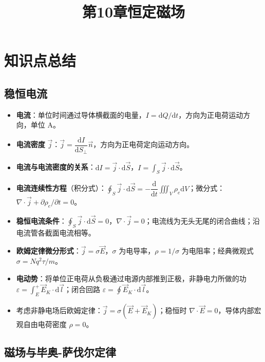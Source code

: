 \documentclass[12pt,a4paper]{ctexart}
\title{第10章\quad 恒定磁场}
\author{}
\date{}
\begin{document}
\maketitle

\section{知识点总结}

\subsection{稳恒电流}

\begin{itemize}
    \item \textbf{电流}：单位时间通过导体横截面的电量，$I=\mathrm dQ/\mathrm dt$，方向为正电荷运动方向，单位 A。
    \item \textbf{电流密度} $\vec j$：$\vec j=\dfrac{\mathrm dI}{\mathrm dS_\perp}\vec n$，方向为正电荷定向运动方向。
    \item \textbf{电流与电流密度的关系}：$\mathrm dI=\vec j\cdot\mathrm d\vec S$，$I=\displaystyle\int_S\vec j\cdot\mathrm d\vec S$。
    \item \textbf{电流连续性方程}（积分式）：$\displaystyle\oint_S\vec j\cdot\mathrm d\vec S=-\dfrac{\mathrm d}{\mathrm dt}\iiint_V\rho_e\mathrm dV$；微分式：$\nabla\cdot\vec j+\partial\rho_e/\partial t=0$。
    \item \textbf{稳恒电流条件}：$\displaystyle\oint_S\vec j\cdot\mathrm d\vec S=0$，$\nabla\cdot\vec j=0$；电流线为无头无尾的闭合曲线；沿电流管各截面电流相等。
    \item \textbf{欧姆定律微分形式}：$\vec j=\sigma\vec E$，$\sigma$ 为电导率，$\rho=1/\sigma$ 为电阻率；经典微观式 $\sigma=Nq^2\tau/m$。
    \item \textbf{电动势}：将单位正电荷从负极通过电源内部推到正极，非静电力所做的功 $\varepsilon=\displaystyle\int_E^+\vec E_K\cdot\mathrm d\vec l$；闭合回路 $\varepsilon=\displaystyle\oint\vec E_K\cdot\mathrm d\vec l$。
    \item 考虑非静电场后欧姆定律：$\vec j=\sigma(\vec E+\vec E_K)$；稳恒时 $\nabla\cdot\vec E=0$，导体内部宏观自由电荷密度 $\rho=0$。
\end{itemize}

\subsection{磁场与毕奥-萨伐尔定律}
\end{document}
